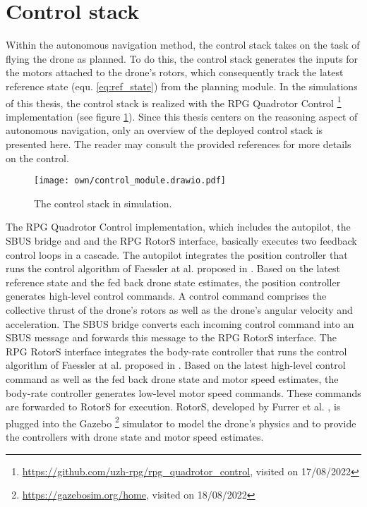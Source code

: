 \section{Control stack} \label{sec:control_stack}
Within the autonomous navigation method, 
the control stack takes on the task of 
flying the drone as planned.
To do this, the control stack
generates the inputs for the motors attached to the drone's rotors,
which consequently track the latest reference state
(equ. \ref{eq:ref_state})
from the planning module.
In the simulations of this thesis,
the control stack is realized with the RPG Quadrotor Control \footnote{
        \url{https://github.com/uzh-rpg/rpg_quadrotor_control}, visited on 17/08/2022
} implementation
(see figure \ref{fig:control_module}).
Since this thesis centers on the reasoning aspect of autonomous navigation, 
only an overview of the deployed control stack is presented here.
The reader may consult the provided references for more details
on the control.

\begin{figure}
    \centering
    \texttt{[image: own/control\_module.drawio.pdf]}
    \caption[
        The control stack in simulation.
    ]{
        The control stack in simulation.
        \label{fig:control_module}}
\end{figure}

The RPG Quadrotor Control implementation,
which includes the autopilot, the SBUS bridge and and the RPG RotorS interface,
basically executes two feedback control loops in a cascade.
The autopilot integrates the position controller 
that runs the control algorithm of Faessler at al. proposed in \cite{Faessler2018}.
Based on the latest reference state and the fed back drone state estimates,
the position controller generates high-level control commands.
A control command comprises 
the collective thrust of the drone's rotors 
as well as the drone's angular velocity and acceleration.
The SBUS bridge converts each incoming control command
into an SBUS message and forwards this message to the
RPG RotorS interface.
The RPG RotorS interface integrates the body-rate controller
that runs the control algorithm of Faessler at al. proposed in \cite{Faessler2017}.
Based on the latest high-level control command 
as well as the fed back drone state and motor speed estimates,
the body-rate controller generates low-level motor speed commands.
These commands are forwarded to RotorS for execution.
RotorS, developed by Furrer et al. \cite{Furrer2016},
is plugged into the Gazebo \footnote{
    \url{https://gazebosim.org/home}, visited on 18/08/2022
}
simulator to model the drone's physics 
and to provide the controllers with
drone state and motor speed estimates.

